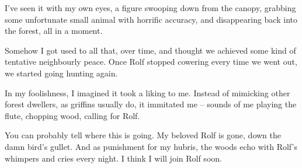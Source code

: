 \begin{multicols}{2}
\begin{exampletext}
  I've seen it with my own eyes, a figure swooping down from the canopy, grabbing some unfortunate small animal with horrific accuracy, and disappearing back into the forest, all in a moment.

  Somehow I got used to all that, over time, and thought we achieved some kind of tentative neighbourly peace.
  Once Rolf stopped cowering every time we went out, we started going hunting again.

  In my foolishness, I imagined it took a liking to me.
  Instead of mimicking other forest dwellers, as \glspl{griffin} usually do, it immitated me -- sounds of me playing the flute, chopping wood, calling for Rolf.

  You can probably tell where this is going.
  My beloved Rolf is gone, down the damn bird's gullet.
  And as punishment for my hubris, the woods echo with Rolf's whimpers and cries every night.
  I think I will join Rolf soon.

\end{exampletext}

\end{multicols}
